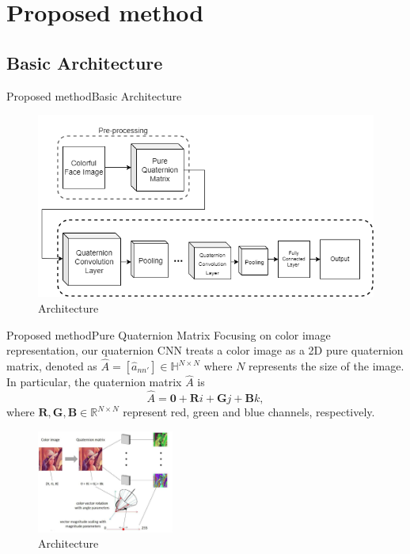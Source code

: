 \documentclass{beamer}
\begin{document}
\section{Proposed method}
\subsection{Basic Architecture}
\begin{frame}{Proposed method}{Basic Architecture}
    \begin{figure}[H]
        \centering
        \includegraphics[width=\textwidth]{img/1.png}
        \caption{Architecture}
    \end{figure}
\end{frame}
\begin{frame}{Proposed method}{Pure Quaternion Matrix}
    Focusing on color image representation, our quaternion CNN treats a color image as a 2D pure quaternion matrix, denoted as $\hat{A}=[\hat{a}_{nn'}]\in \mathbb{H}^{N\times N}$ where $N$ represents the size of the image. In particular, the quaternion matrix $\hat{A}$ is 
    \begin{equation}
        \hat{A}=\mathbf{0}+\textbf{R}i+\textbf{G}j+\textbf{B}k,
    \end{equation}
    where $\textbf{R},\textbf{G},\textbf{B}\in \mathbb{R}^{N\times N}$ represent red, green and blue channels, respectively.
    \begin{figure}[H]
        \centering
        \includegraphics[width=0.4\textwidth]{img/2.jpg}
        \caption{Architecture}
    \end{figure}
\end{frame}
\end{document}
